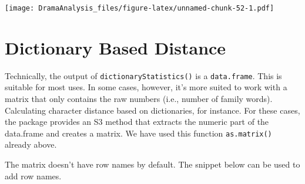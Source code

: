 \documentclass[]{book}
\newenvironment{Shaded}{\begin{snugshade}}{\end{snugshade}}
\newcommand{\DataTypeTok}[1]{\textcolor[rgb]{0.13,0.29,0.53}{#1}}
\newcommand{\FloatTok}[1]{\textcolor[rgb]{0.00,0.00,0.81}{#1}}
\newcommand{\KeywordTok}[1]{\textcolor[rgb]{0.13,0.29,0.53}{\textbf{#1}}}
\newcommand{\NormalTok}[1]{#1}
\newcommand{\OperatorTok}[1]{\textcolor[rgb]{0.81,0.36,0.00}{\textbf{#1}}}
\newcommand{\OtherTok}[1]{\textcolor[rgb]{0.56,0.35,0.01}{#1}}
\newcommand{\StringTok}[1]{\textcolor[rgb]{0.31,0.60,0.02}{#1}}
\begin{document}
\texttt{[image: DramaAnalysis\_files/figure-latex/unnamed-chunk-52-1.pdf]}

\hypertarget{dictionary-based-distance}{%
\section{Dictionary Based Distance}\label{dictionary-based-distance}}

Technically, the output of \texttt{dictionaryStatistics()} is a \texttt{data.frame}. This is suitable for most uses. In some cases, however, it's more suited to work with a matrix that only contains the raw numbers (i.e., number of family words). Calculating character distance based on dictionaries, for instance. For these cases, the package provides an S3 method that extracts the numeric part of the data.frame and creates a matrix. We have used this function \texttt{as.matrix()} already above.

The matrix doesn't have row names by default. The snippet below can be used to add row names.

\begin{Shaded}
\end{Shaded}
\end{document}
